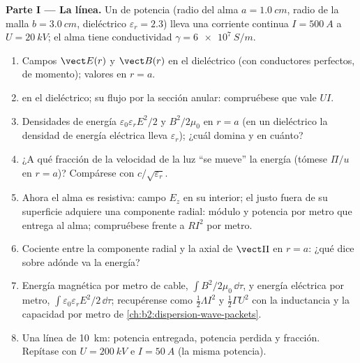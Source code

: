 \begin{problem}
\label{pb:b2:poynting-vector:1}

\medskip
\noindent\textbf{Parte I --- La línea.}
Un  de potencia (radio del alma $a = \qty{1.0}{cm}$, radio de la malla $b =
\qty{3.0}{cm}$, dieléctrico $\varepsilon_r = 2.3$) lleva una corriente continua $I =
\qty{500}{A}$ a $U = \qty{20}{kV}$; el alma tiene conductividad $\gamma =
\qty{6e7}{S/m}$.
\begin{enumerate}
  \item Campos $\vect E(r)$ y $\vect B(r)$ en el dieléctrico (con
        conductores perfectos, de momento); valores en $r = a$.
  \item {} en el dieléctrico; su flujo por la sección
        anular: compruébese que vale $UI$.
  \item Densidades de energía $\varepsilon_0\varepsilon_rE^2/2$ y $B^2/2\mu_0$ en $r = a$
        (en un dieléctrico la densidad de energía eléctrica lleva
        $\varepsilon_r$); ¿cuál domina y en cuánto?
  \item ¿A qué fracción de la velocidad de la luz ``se mueve'' la energía
        (tómese $\Pi/u$ en $r = a$)? Compárese con $c/\sqrt{\varepsilon_r}$.
  \item Ahora el alma es resistiva: campo $E_z$ en su interior; el  justo fuera de su superficie adquiere una componente
        radial: módulo y potencia por metro que entrega al alma;
        compruébese frente a $RI^2$ por metro.
  \item Cociente entre la componente radial y la axial de $\vect\Pi$ en $r =
        a$: ¿qué dice sobre adónde va la energía?
  \item Energía magnética por metro de cable, $\int B^2/2\mu_0\,\dd\tau$, y
        energía eléctrica por metro, $\int\varepsilon_0\varepsilon_rE^2/2\,\dd\tau$;
        recupérense como $\tfrac12\Lambda I^2$ y $\tfrac12\Gamma U^2$ con la
        inductancia y la capacidad por metro de \cref{ch:b2:dispersion-wave-packets}.
  \item Una línea de \qty{10}{km}: potencia entregada, potencia perdida y
        fracción. Repítase con $U = \qty{200}{kV}$ e $I = \qty{50}{A}$ (la misma potencia).
\end{enumerate}


\end{problem}
